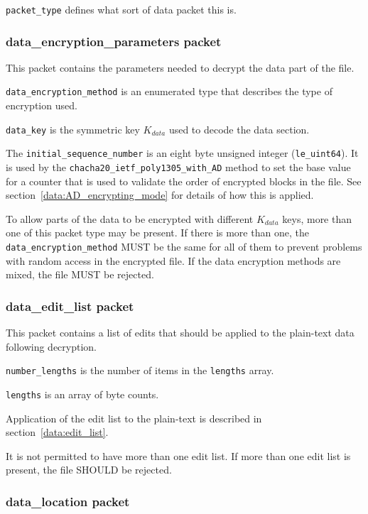 \documentclass[10pt]{article}
\newcommand{\kw}[1]{\texttt{#1}}
\newcommand{\datatype}[1]{\kw{#1}}
\begin{document}
\kw{packet\_type} defines what sort of data packet this is.

\subsubsection{data\_encryption\_parameters packet}\label{header:data_encryption_parameters}

This packet contains the parameters needed to decrypt the data part of the file.

\kw{data\_encryption\_method} is an enumerated type that describes the type of encryption used.

\kw{data\_key} is the symmetric key $K_{data}$ used to decode the data section.

The \kw{initial\_sequence\_number} is an eight byte unsigned integer (\datatype{le\_uint64}).
It is used by the \kw{chacha20\_ietf\_poly1305\_with\_AD} method to set the
base value for a counter that is used to validate the order of encrypted blocks
in the file.
See section~\ref{data:AD_encrypting_mode} for details of how this is applied.

To allow parts of the data to be encrypted with different $K_{data}$ keys,
more than one of this packet type may be present.
If there is more than one, the \kw{data\_encryption\_method} MUST be the same for all of them to prevent problems
with random access in the encrypted file.
If the data encryption methods are mixed, the file MUST be rejected.

\subsubsection{data\_edit\_list packet}

This packet contains a list of edits that should be applied to the plain-text data following decryption.

\kw{number\_lengths} is the number of items in the \kw{lengths} array.

\kw{lengths} is an array of byte counts.

Application of the edit list to the plain-text is described in section~\ref{data:edit_list}.

It is not permitted to have more than one edit list.
If more than one edit list is present, the file SHOULD be rejected.

\subsubsection{data\_location packet}
\end{document}
